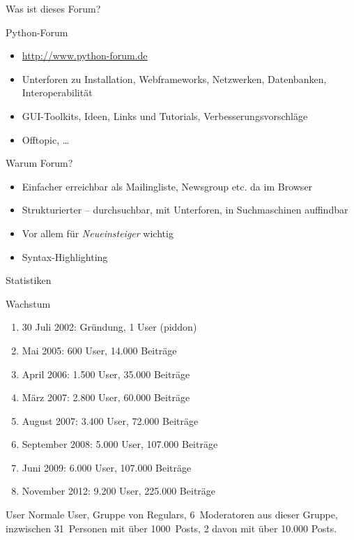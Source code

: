 \documentclass{beamer}
\begin{document}
\begin{frame}{Was ist dieses Forum?}
  \begin{block}{Python-Forum}
    \begin{itemize}
      \item \url{http://www.python-forum.de}
      \item Unterforen zu Installation, Webframeworks, Netzwerken, Datenbanken,
	Interoperabilität
      \item GUI-Toolkits, Ideen, Links und Tutorials, Verbesserungsvorschläge
      \item Offtopic, …
    \end{itemize}
  \end{block}
  \begin{block}{Warum Forum?}
    \begin{itemize}
      \item Einfacher erreichbar als Mailingliste, Newsgroup etc. da im Browser
      \item Strukturierter – durchsuchbar, mit Unterforen, in Suchmaschinen auffindbar
      \item Vor allem für \emph{Neueinsteiger} wichtig
      \item Syntax-Highlighting 
    \end{itemize}
  \end{block}
\end{frame}

\begin{frame}{Statistiken}
  \begin{block}{Wachstum}
    \begin{enumerate}
      \item 30 Juli 2002: Gründung, 1 User (piddon)
      \item Mai 2005: 600 User, 14.000 Beiträge
      \item April 2006: 1.500 User, 35.000 Beiträge
      \item März 2007: 2.800 User, 60.000 Beiträge
      \item August 2007: 3.400 User, 72.000 Beiträge
      \item September 2008: 5.000 User, 107.000 Beiträge
      \item Juni 2009: 6.000 User, 107.000 Beiträge
      \item November 2012: 9.200 User, 225.000 Beiträge
    \end{enumerate}
  \end{block}
  \begin{block}{User}
    Normale User, Gruppe von Regulars, 6~Moderatoren aus dieser Gruppe, inzwischen
    31~Personen mit über 1000~Posts, 2 davon mit über 10.000 Posts.
  \end{block}
\end{frame}
\end{document}
